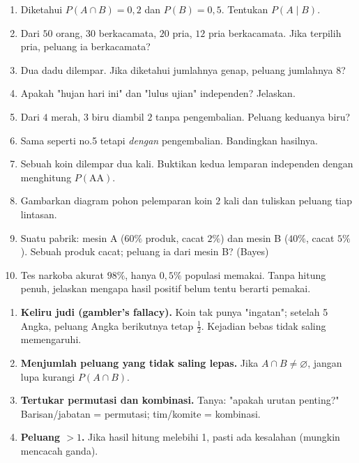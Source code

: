 \documentclass[11pt,a4paper]{report}
\theoremstyle{gaya}
\begin{document}
\begin{latihan}
\begin{enumerate}[leftmargin=*]
  \item Diketahui $P(A\cap B)=0{,}2$ dan $P(B)=0{,}5$. Tentukan $P(A\mid B)$.
  \item Dari $50$ orang, $30$ berkacamata, $20$ pria, $12$ pria berkacamata. Jika terpilih pria, peluang ia berkacamata?
  \item Dua dadu dilempar. Jika diketahui jumlahnya genap, peluang jumlahnya $8$?
  \item Apakah "hujan hari ini" dan "lulus ujian" independen? Jelaskan.
  \item Dari $4$ merah, $3$ biru diambil $2$ tanpa pengembalian. Peluang keduanya biru?
  \item Sama seperti no.5 tetapi \emph{dengan} pengembalian. Bandingkan hasilnya.
  \item Sebuah koin dilempar dua kali. Buktikan kedua lemparan independen dengan menghitung $P(\text{AA})$.
  \item Gambarkan diagram pohon pelemparan koin $2$ kali dan tuliskan peluang tiap lintasan.
  \item Suatu pabrik: mesin A ($60\%$ produk, cacat $2\%$) dan mesin B ($40\%$, cacat $5\%$). Sebuah produk cacat; peluang ia dari mesin B? (Bayes)
  \item Tes narkoba akurat $98\%$, hanya $0{,}5\%$ populasi memakai. Tanpa hitung penuh, jelaskan mengapa hasil positif belum tentu berarti pemakai.
\end{enumerate}
\end{latihan}

\begin{kesalahan}
\begin{enumerate}[leftmargin=*,topsep=2pt]
  \item \textbf{Keliru judi (gambler's fallacy).} Koin tak punya "ingatan"; setelah 5 Angka, peluang Angka berikutnya tetap $\tfrac12$. Kejadian bebas tidak saling memengaruhi.
  \item \textbf{Menjumlah peluang yang tidak saling lepas.} Jika $A\cap B\neq\varnothing$, jangan lupa kurangi $P(A\cap B)$.
  \item \textbf{Tertukar permutasi dan kombinasi.} Tanya: "apakah urutan penting?" Barisan/jabatan = permutasi; tim/komite = kombinasi.
  \item \textbf{Peluang $>1$.} Jika hasil hitung melebihi 1, pasti ada kesalahan (mungkin mencacah ganda).
\end{enumerate}
\end{kesalahan}
\end{document}
